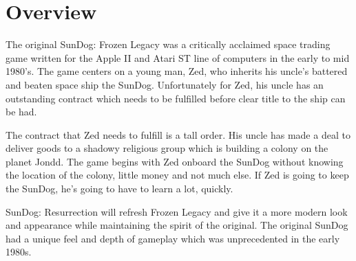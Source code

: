 \section{Overview}

The original SunDog: Frozen Legacy was a critically acclaimed space trading
game written for the Apple II and Atari ST line of computers in the early
to mid 1980's.  The game centers on a young man, Zed, who inherits his
uncle's battered and beaten space ship the SunDog.  Unfortunately for Zed, his
uncle has an outstanding contract which needs to be fulfilled before clear
title to the ship can be had.

The contract that Zed needs to fulfill is a tall order.  His uncle has made a
deal to deliver goods to a shadowy religious group which is building a
colony on the planet Jondd.  The game begins with Zed onboard the
SunDog without knowing the location of the colony, little money and not
much else.  If Zed is going to keep the SunDog, he's going to have to learn
a lot, quickly.

SunDog: Resurrection will refresh Frozen Legacy and give it a more modern
look and appearance while maintaining the spirit of the original.  The 
original SunDog had a unique feel and depth of gameplay which was 
unprecedented in the early 1980s.

